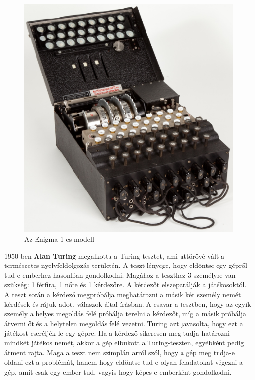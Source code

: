 \begin{figure}[h]
\centering
\includegraphics[scale=0.6]{images/enigma.jpg}
\caption{Az Enigma 1-es modell \cite{enigma}}
\label{fig:enigma}
\end{figure}

1950-ben \textbf{Alan Turing} megalkotta a Turing-tesztet, ami úttörővé vált a természetes nyelvfeldolgozás területén. A teszt lényege, hogy eldöntse egy gépről tud-e emberhez hasonlóan gondolkodni. Magához a teszthez 3 személyre van szükség: 1 férfira, 1 nőre és 1 kérdezőre. A kérdezőt elszeparálják a játékosoktól. A teszt során a kérdező megpróbálja meghatározni a másik két személy nemét kérdések és rájuk adott válaszok által írásban. A csavar a tesztben, hogy az egyik személy a helyes megoldás felé próbálja terelni a kérdezőt, míg a másik próbálja átverni őt és a helytelen megoldás felé vezetni. Turing azt javasolta, hogy ezt a játékost cseréljék le egy gépre. Ha a kérdező sikeresen meg tudja határozni mindkét játékos nemét, akkor a gép elbukott a Turing-teszten, egyébként pedig átment rajta. Maga a teszt nem szimplán arról szól, hogy a gép meg tudja-e oldani ezt a problémát, hanem hogy eldöntse tud-e olyan feladatokat végezni a gép, amit csak egy ember tud, vagyis hogy képes-e emberként gondolkodni.

